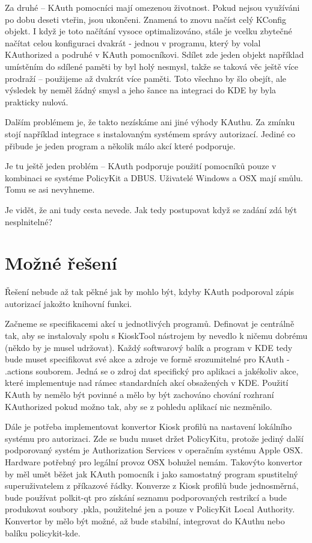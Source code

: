 Za druhé -- KAuth pomocníci mají omezenou životnost. Pokud nejsou využíváni po
dobu deseti vteřin, jsou ukončeni. Znamená to znovu načíst celý KConfig objekt.
I když je toto načítání vysoce optimalizováno, stále je vcelku zbytečné načítat
celou konfiguraci dvakrát - jednou v programu, který by volal KAuthorized
a podruhé v KAuth pomocníkovi. Sdílet zde jeden objekt například umístěním
do sdílené paměti by byl holý nesmysl, takže se taková věc ještě více prodraží
-- použijeme až dvakrát více paměti.
Toto všechno by šlo obejít, ale výsledek by neměl žádný smysl a jeho šance na
integraci do KDE by byla prakticky nulová.

Dalším problémem je, že takto nezískáme ani jiné výhody KAuthu. Za zmínku stojí
například integrace s instalovaným systémem správy autorizací. Jediné co přibude
je jeden program a několik málo akcí které podporuje.

Je tu ještě jeden problém -- KAuth podporuje použití pomocníků pouze
v kombinaci se systéme PolicyKit a DBUS. Uživatelé Windows a OSX mají smůlu.
Tomu se asi nevyhneme.

Je vidět, že ani tudy cesta nevede. Jak tedy postupovat když se zadání zdá být
nesplnitelné?

\section{Možné řešení}
Řešení nebude až tak pěkné jak by mohlo být, kdyby KAuth podporoval zápis
autorizací jakožto knihovní funkci.

Začneme se specifikacemi akcí u jednotlivých programů. Definovat je centrálně
tak, aby se instalovaly spolu s KioskTool nástrojem by nevedlo k ničemu dobrému
(někdo by je musel udržovat). Každý softwarový balík a program v KDE tedy bude
muset specifikovat své akce a zdroje ve formě srozumitelné pro KAuth - .actions
souborem. Jedná se o zdroj dat specifický pro aplikaci a jakékoliv akce, které
implementuje nad rámec standardních akcí obsažených v KDE. Použití KAuth
by nemělo být povinné a mělo by být zachováno chování rozhraní KAuthorized pokud
možno tak, aby se z pohledu aplikací nic nezměnilo.

Dále je potřeba implementovat konvertor Kiosk profilů na nastavení lokálního
systému pro autorizaci. Zde se budu muset držet PolicyKitu, protože jediný další
podporovaný systém je Authorization Services v operačním systému Apple OSX.
Hardware potřebný pro legální provoz OSX bohužel nemám.
Takovýto konvertor by měl umět běžet jak KAuth pomocník i jako samostatný
program spustitelný superuživatelem z příkazové řádky. Konverze z Kiosk profilů
bude jednosměrná, bude používat polkit-qt pro získání seznamu podporovaných
restrikcí a bude produkovat soubory .pkla, použitelné jen a pouze v PolicyKit
Local Authority. Konvertor by mělo být možné, až bude stabilní, integrovat
do KAuthu nebo balíku policykit-kde.

